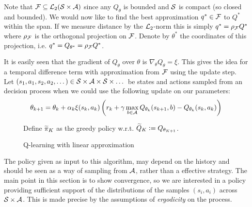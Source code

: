 Note that $\mathcal{F} \subseteq \mathcal{L}_2(\mathcal{S}\times\mathcal{A})$ since any
$Q_\theta$ is bounded and $\mathcal{S}$ is compact (so closed and bounded).
We would now like to find the best approximation
$q^* \in \mathcal{F}$ to $Q^*$ within the span.
If we measure distance by the $\mathcal{L}_2$-norm this is
simply $q^* = \rho_\mathcal{F} Q^*$ where $\rho_\mathcal{F}$ is the orthogonal projection on
$\mathcal{F}$. Denote by $\theta^*$ the coordinates of this projection, i.e.
$q^* = Q_{\theta^*} = \rho_\mathcal{F} Q^*$.

It is easily seen that the gradient of $Q_\theta$ over $\theta$ is
$\nabla_\theta Q_\theta = \xi$.
This gives the idea for a temporal difference term with approximation from
$\mathcal{F}$ using the update step.
Let $(s_1, a_1, s_2, a_2, \dots) \in \mathcal{S} \times \mathcal{A} \times \mathcal{S} \times
\dots$ be states and actions sampled from
an decision process when we could use the following update on our
parameters:
\begin{equation}
  \theta_{k+1} = \theta_k + \alpha_k \xi(s_k, a_k)
  \left( r_k + \gamma \max_{b \in \mathcal{A}} Q_{\theta_k}(s_{k+1}, b)
- Q_{\theta_k}(s_k, a_k) \right)
\label{eq:linApproxUpdateStep}
\end{equation}

\begin{figure}[H]
\begin{algorithm}[H] %
  \caption{Q-learning with linear approximation}

  Define $\widetilde{\pi}_K$ as the greedy policy w.r.t.
  $\widetilde{Q}_K \vcentcolon= Q_{\theta_{K+1}}$.

  \label{alg:QLlinear}
\end{algorithm}
\end{figure}
The policy given as input to this algorithm, may depend on the history
and should be seen as a way of sampling from $\mathcal{A}$, rather than
a effective strategy. The main point in this section is to show convergence,
so we are 
interested in a policy providing sufficient support of the distributions
of the samples $(s_i, a_i)$ across $\mathcal{S} \times \mathcal{A}$.
This is made precise by the assumptions of \emph{ergodicity} on the process.

